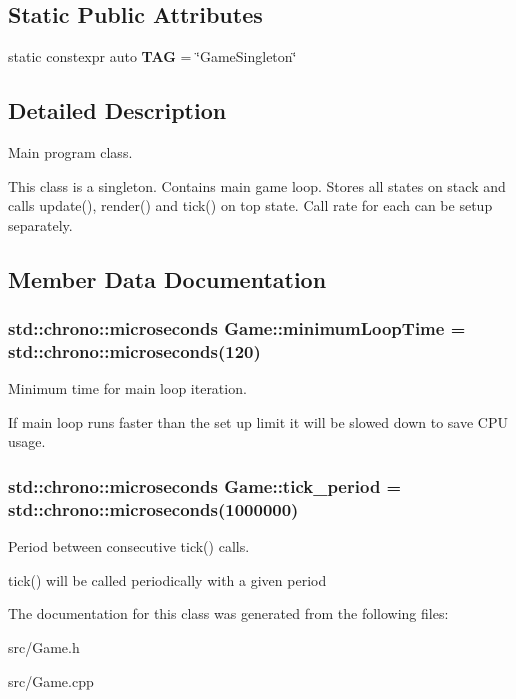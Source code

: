 \subsection*{Static Public Attributes}
\begin{DoxyCompactItemize}
\item 
\hypertarget{classGame_a43d300e0d66811f7317d88e3476d6de3}{static constexpr auto {\bfseries T\-A\-G} = \char`\"{}Game\-Singleton\char`\"{}}\label{classGame_a43d300e0d66811f7317d88e3476d6de3}

\end{DoxyCompactItemize}


\subsection{Detailed Description}
Main program class. 

This class is a singleton. Contains main game loop. Stores all states on stack and calls update(), render() and tick() on top state. Call rate for each can be setup separately. 

\subsection{Member Data Documentation}
\hypertarget{classGame_af9f24863bbe8102d1bf5d97aaa449d14}{
\subsubsection[{minimum\-Loop\-Time}]{\setlength{\rightskip}{0pt plus 5cm}std\-::chrono\-::microseconds Game\-::minimum\-Loop\-Time = std\-::chrono\-::microseconds(120)}}\label{classGame_af9f24863bbe8102d1bf5d97aaa449d14}


Minimum time for main loop iteration. 

If main loop runs faster than the set up limit it will be slowed down to save C\-P\-U usage. \hypertarget{classGame_a65800b8c8afee406d719b404a4a78877}{
\subsubsection[{tick\-\_\-period}]{\setlength{\rightskip}{0pt plus 5cm}std\-::chrono\-::microseconds Game\-::tick\-\_\-period = std\-::chrono\-::microseconds(1000000)}}\label{classGame_a65800b8c8afee406d719b404a4a78877}


Period between consecutive tick() calls. 

tick() will be called periodically with a given period 

The documentation for this class was generated from the following files\-:\begin{DoxyCompactItemize}
\item 
src/Game.\-h\item 
src/Game.\-cpp\end{DoxyCompactItemize}
